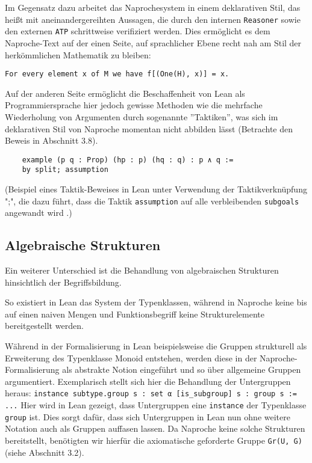 \documentclass[a4paper,12pt]{scrartcl}
\newcommand{\ls}[1]{\lstinline|#1|}
\begin{document}
Im Gegensatz dazu arbeitet das Naprochesystem in einem deklarativen Stil, das heißt mit aneinandergereihten Aussagen, die durch den internen \verb!Reasoner! sowie den externen \verb!ATP! schrittweise verifiziert werden. Dies ermöglicht es dem Naproche-Text auf der einen Seite, auf sprachlicher Ebene recht nah am Stil der herkömmlichen Mathematik zu bleiben:

\lstset{language=ftl}
\begin{lstlisting}
For every element x of M we have f[(One(H), x)] = x.
\end{lstlisting}

Auf der anderen Seite ermöglicht die Beschaffenheit von Lean als Programmiersprache hier jedoch gewisse Methoden wie die mehrfache Wiederholung von Argumenten durch sogenannte ''Taktiken'', was sich im deklarativen Stil von Naproche momentan nicht abbilden lässt (Betrachte den Beweis in Abschnitt 3.8).

\lstset{language=lean}
\begin{lstlisting}
    example (p q : Prop) (hp : p) (hq : q) : p ∧ q :=
    by split; assumption
\end{lstlisting}

(Beispiel eines Taktik-Beweises in Lean unter Verwendung der Taktikverknüpfung ";", die dazu führt, dass die Taktik \lstinline{assumption} auf alle verbleibenden \lstinline{subgoals} angewandt wird \cite{bibtex.e}.)

\subsection{Algebraische Strukturen}

Ein weiterer Unterschied ist die Behandlung von algebraischen Strukturen hinsichtlich der Begriffsbildung.

So existiert in Lean das System der Typenklassen, während in Naproche keine bis auf einen naiven Mengen und Funktionsbegriff keine Strukturelemente bereitgestellt werden.

Während in der Formalisierung in Lean beispielsweise die Gruppen strukturell als Erweiterung des Typenklasse Monoid entstehen, werden diese in der Naproche-Formalisierung als abstrakte Notion eingeführt und so über allgemeine Gruppen argumentiert. Exemplarisch stellt sich hier die Behandlung der Untergruppen heraus:
\lstinline{instance subtype.group s : set α [is_subgroup] s : group s := ...} Hier wird in Lean gezeigt, dass Untergruppen eine \ls{instance} der Typenklasse \ls{group} ist. Dies sorgt dafür, dass sich Untergruppen in Lean nun ohne weitere Notation auch als Gruppen auffasen lassen.
Da Naproche keine solche Strukturen bereitstellt, benötigten wir hierfür die axiomatische geforderte Gruppe \verb!Gr(U, G)! (siehe Abschnitt 3.2).
\end{document}
